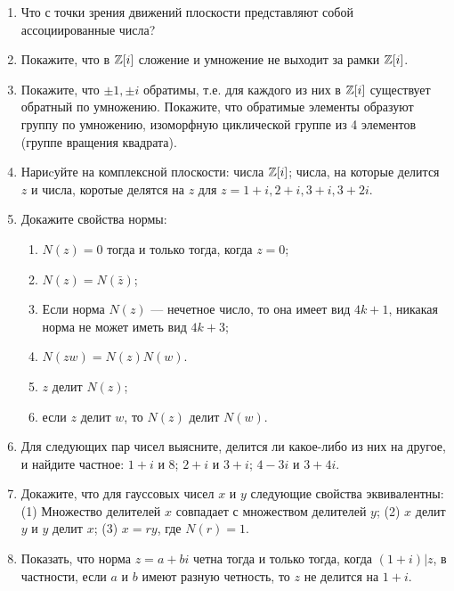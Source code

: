 \begin{enumerate}
\item Что с точки зрения движений плоскости представляют собой ассоциированные числа?

\item Покажите, что в $\mathbb Z[i]$ сложение и умножение не выходит за
рамки $\mathbb Z[i]$.
\item \ipunkt Покажите, что $\pm1,\pm i$ обратимы, т.е. для каждого из них в $\mathbb Z[i]$ существует обратный по умножению.
\ipunkt Покажите, что
обратимые элементы образуют группу по умножению, изоморфную циклической группе из 4 элементов (группе вращения квадрата).
\item Нариcуйте на комплексной плоскости: \ipunkt числа $\mathbb Z[i]$; \ipunkt числа,
на которые делится $z$ и \ipunkt числа, коротые делятся на $z$ для 
$z = 1 +i, 2 + i, 3 + i, 3 + 2i$.

\item Докажите свойства нормы:
\begin{enumerate}
\item $N(z)=0$ тогда и только тогда, когда $z=0$;
\item $N(z)=N(\bar z)$;
\item Если норма $N(z)$ --- нечетное число, то она имеет вид $4k+1$, никакая норма не может иметь вид $4k+3$;
\item $N(zw)=N(z)N(w)$.
\item $z$ делит $N(z)$; 
\item если $z$ делит $w$, то $N(z)$ делит $N(w)$.
\end{enumerate}


\item Для следующих пар чисел выясните, делится ли какое-либо из них на другое, и найдите
частное: $1 + i$ и 8; $2 + i$ и $3 + i$; $4 - 3i$ и $3 + 4i$.
\item Докажите, что для гауссовых чисел $x$ и $y$ следующие свойства эквивалентны: (1) Множество
делителей $x$ совпадает с множеством делителей $y$; (2) $x$ делит $y$ и $y$ делит $x$; (3) $x = ry$, где $N(r) = 1$.
\item Показать, что норма $z = a + bi$ четна тогда и только тогда, когда $(1 + i)|z$, в частности,
если $a$ и $b$ имеют разную четность, то $z$ не делится на $1 + i$.


\end{enumerate}
